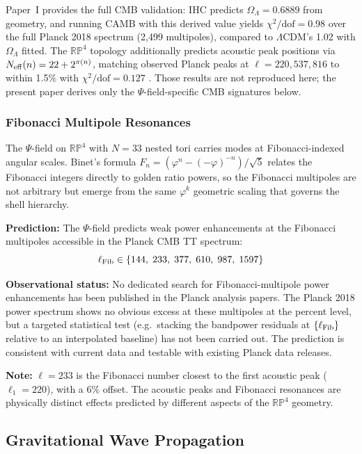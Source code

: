 Paper~I \citep{Peacock2026a} provides the full CMB validation: IHC predicts
$\Omega_\Lambda = 0.6889$ from geometry, and running CAMB with this derived
value yields $\chi^2/\mathrm{dof} = 0.98$ over the full Planck 2018 spectrum
(2,499 multipoles), compared to $\Lambda$CDM's 1.02 with $\Omega_\Lambda$ fitted.
The $\mathbb{RP}^4$ topology additionally predicts acoustic peak positions
via $N_{\rm eff}(n) = 22 + 2^{\pi(n)}$, matching observed Planck peaks at
$\ell = 220, 537, 816$ to within 1.5\% with $\chi^2/\mathrm{dof} = 0.127$
\citep{Peacock2026a}.
Those results are not reproduced here; the present paper derives only the
$\Psi$-field-specific CMB signatures below.

\subsubsection{Fibonacci Multipole Resonances}

The $\Psi$-field on $\mathbb{RP}^4$ with $N = 33$ nested tori carries modes at
Fibonacci-indexed angular scales. Binet's formula $F_n = (\varphi^n - (-\varphi)^{-n})/\sqrt{5}$
relates the Fibonacci integers directly to golden ratio powers, so the Fibonacci
multipoles are not arbitrary but emerge from the same $\varphi^k$ geometric scaling
that governs the shell hierarchy.

\textbf{Prediction:} The $\Psi$-field predicts weak power enhancements at the
Fibonacci multipoles accessible in the Planck CMB TT spectrum:
\begin{equation}
\ell_{\rm Fib} \in \{144,\; 233,\; 377,\; 610,\; 987,\; 1597\}
\end{equation}

\textbf{Observational status:}
No dedicated search for Fibonacci-multipole power enhancements has been
published in the Planck analysis papers. The Planck 2018 power spectrum
\citep{Planck2020} shows no obvious excess at these multipoles at the
percent level, but a targeted statistical test (e.g.\ stacking the
bandpower residuals at $\{\ell_{\rm Fib}\}$ relative to an interpolated
baseline) has not been carried out. The prediction is consistent with
current data and testable with existing Planck data releases.

\textbf{Note:} $\ell = 233$ is the Fibonacci number closest to the
first acoustic peak ($\ell_1 = 220$), with a 6\% offset.
The acoustic peaks and Fibonacci resonances are physically distinct
effects predicted by different aspects of the $\mathbb{RP}^4$ geometry.

\subsection{Gravitational Wave Propagation}

